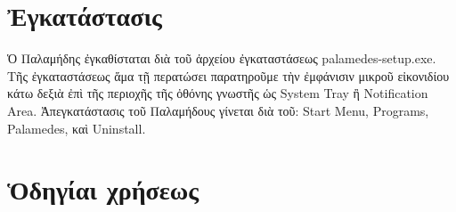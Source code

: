 \documentclass[12pt,a4paper]{article}
\begin{document}
\section*{Ἐγκατάστασις}
  Ὁ Παλαμήδης ἐγκαθίσταται διὰ τοῦ ἀρχείου ἐγκαταστάσεως
  \textsf{palamedes-setup.exe}. Τῆς ἐγκαταστάσεως ἅμα τῇ περατώσει παρατηροῦμε
  τὴν ἐμφάνισιν μικροῦ εἰκονιδίου κάτω δεξιὰ ἐπὶ τῆς περιοχῆς τῆς ὀθόνης
  γνωστῆς ὡς System Tray ἢ Notification Area. 
  Ἀπεγκατάστασις τοῦ Παλαμήδους γίνεται διὰ τοῦ: 
  \textsf{Start Menu, Programs, Palamedes}, καὶ \textsf{Uninstall}.

\section*{Ὁδηγίαι χρήσεως}
\end{document}
